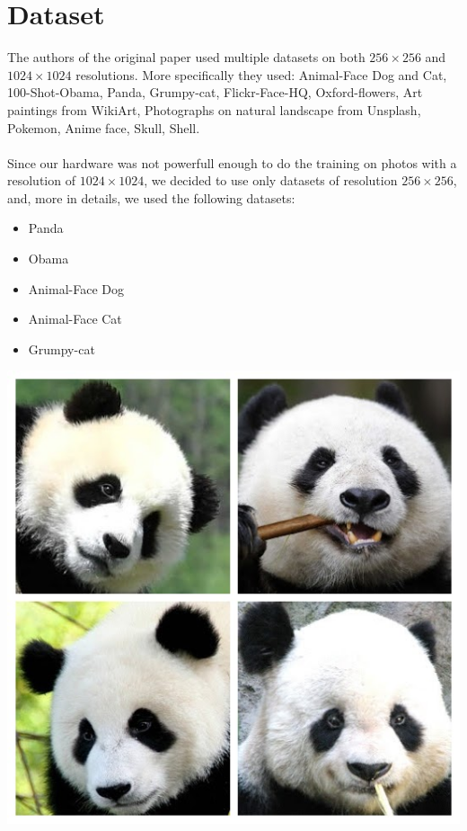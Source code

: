 \documentclass[12pt]{article}
\begin{document}
\section{Dataset}
\large
The authors of the original paper used multiple datasets on both $256 \times 256$ and $1024 \times 1024$ resolutions. More specifically
they used: Animal-Face Dog and Cat, 100-Shot-Obama, Panda, Grumpy-cat, Flickr-Face-HQ, 
Oxford-flowers, Art paintings from WikiArt, Photographs on natural landscape from Unsplash, 
Pokemon, Anime face, Skull, Shell.\\\\ 
Since our hardware was not powerfull enough to do the training on photos with a resolution of $1024 \times 1024$, we decided to use only
datasets of resolution $256 \times 256$, and, more in details, we used the following datasets: 
\begin{itemize}
	\item Panda
	\item Obama
	\item Animal-Face Dog
	\item Animal-Face Cat
	\item Grumpy-cat\\
\end{itemize}
\begin{minipage}[t]{0.2\textwidth}
	\includegraphics[width=1\textwidth]{Images/panda.jpg}
\end{minipage}
\end{document}
